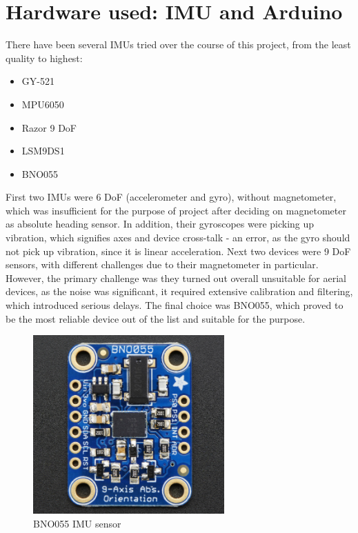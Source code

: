 \section{Hardware used: IMU and Arduino}

There have been several IMUs tried over the course of this project, from the least quality to highest:
 
\begin{itemize}
\item GY-521 
\item MPU6050
\item Razor 9 DoF
\item LSM9DS1
\item BNO055 
\end{itemize}


First two IMUs were 6 DoF (accelerometer and gyro), without magnetometer, which was insufficient for the purpose of project after deciding on magnetometer as absolute heading sensor. In addition, their gyroscopes were picking up vibration, which signifies axes and device cross-talk - an error, as the gyro should not pick up vibration, since it is linear acceleration. Next two devices were 9 DoF sensors, with different challenges due to their magnetometer in particular. However, the primary challenge was they turned out overall unsuitable for aerial devices, as the noise was significant, it required extensive calibration and filtering, which introduced serious delays. The final choice was BNO055, which proved to be the most reliable device out of the list and suitable for the purpose.
 
\begin{figure}[H]
    \centering
    \includegraphics[scale=0.8]{graphics/BNO055.png}
    \caption{BNO055 IMU sensor}
     \label{fig:mag_uncalibrated}
\end{figure} 
 
